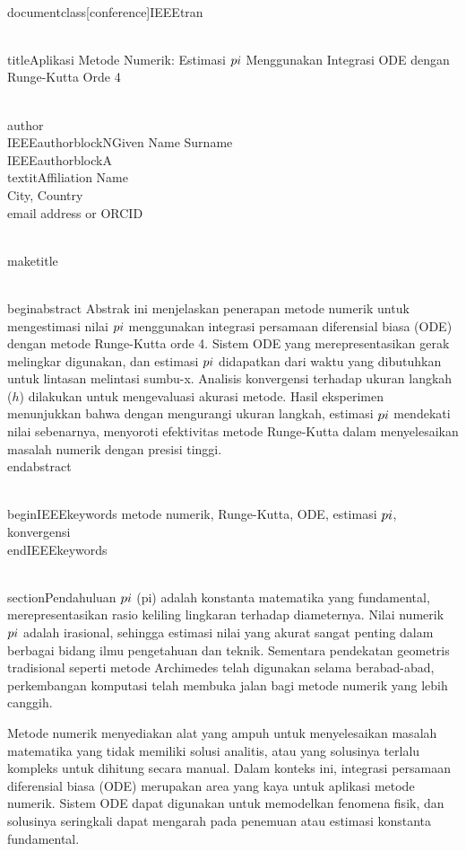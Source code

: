 \\documentclass[conference]{IEEEtran}
\begin{document}
\\title{Aplikasi Metode Numerik: Estimasi $\\pi$ Menggunakan Integrasi ODE dengan Runge-Kutta Orde 4}

\\author{\\IEEEauthorblockN{Given Name Surname}
\\IEEEauthorblockA{\\textit{Affiliation Name} \\
City, Country \\
email address or ORCID}
}

\\maketitle

\\begin{abstract}
Abstrak ini menjelaskan penerapan metode numerik untuk mengestimasi nilai $\\pi$ menggunakan integrasi persamaan diferensial biasa (ODE) dengan metode Runge-Kutta orde 4. Sistem ODE yang merepresentasikan gerak melingkar digunakan, dan estimasi $\\pi$ didapatkan dari waktu yang dibutuhkan untuk lintasan melintasi sumbu-x. Analisis konvergensi terhadap ukuran langkah ($h$) dilakukan untuk mengevaluasi akurasi metode. Hasil eksperimen menunjukkan bahwa dengan mengurangi ukuran langkah, estimasi $\\pi$ mendekati nilai sebenarnya, menyoroti efektivitas metode Runge-Kutta dalam menyelesaikan masalah numerik dengan presisi tinggi.
\\end{abstract}

\\begin{IEEEkeywords}
metode numerik, Runge-Kutta, ODE, estimasi $\\pi$, konvergensi
\\end{IEEEkeywords}

\\section{Pendahuluan}
$\\pi$ (pi) adalah konstanta matematika yang fundamental, merepresentasikan rasio keliling lingkaran terhadap diameternya. Nilai numerik $\\pi$ adalah irasional, sehingga estimasi nilai yang akurat sangat penting dalam berbagai bidang ilmu pengetahuan dan teknik. Sementara pendekatan geometris tradisional seperti metode Archimedes telah digunakan selama berabad-abad, perkembangan komputasi telah membuka jalan bagi metode numerik yang lebih canggih.

Metode numerik menyediakan alat yang ampuh untuk menyelesaikan masalah matematika yang tidak memiliki solusi analitis, atau yang solusinya terlalu kompleks untuk dihitung secara manual. Dalam konteks ini, integrasi persamaan diferensial biasa (ODE) merupakan area yang kaya untuk aplikasi metode numerik. Sistem ODE dapat digunakan untuk memodelkan fenomena fisik, dan solusinya seringkali dapat mengarah pada penemuan atau estimasi konstanta fundamental.
\end{document}
